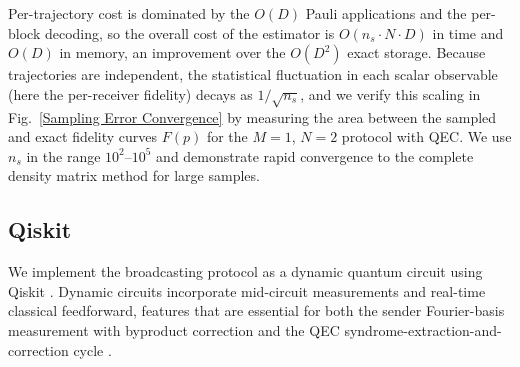 Per-trajectory cost is dominated by the $O(D)$ Pauli applications and the per-block decoding, so the overall cost of the estimator is $O(n_s \cdot N \cdot D)$ in time and $O(D)$ in memory, an improvement over the $O(D^2)$ exact storage. Because trajectories are independent, the statistical fluctuation in each scalar observable (here the per-receiver fidelity) decays as $1/\sqrt{n_s}$, and we verify this scaling in Fig.~\ref{Sampling Error Convergence} by measuring the area between the sampled and exact fidelity curves $F(p)$ for the $M{=}1$, $N{=}2$ protocol with QEC. We use $n_s$ in the range $10^2$--$10^5$ and demonstrate rapid convergence to the complete density matrix method for large samples.
\\

\subsection{Qiskit}


We implement the broadcasting protocol as a dynamic quantum circuit using Qiskit \cite{javadi2024qiskit}. Dynamic circuits incorporate mid-circuit measurements and real-time classical feedforward, features that are essential for both the sender Fourier-basis measurement with byproduct correction and the QEC syndrome-extraction-and-correction cycle \cite{corcoles2021dynamic}.

